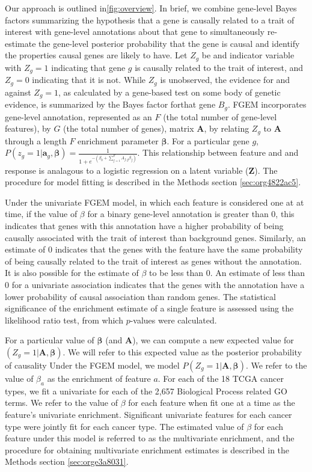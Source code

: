 Our approach is outlined in\ref{fig:overview}. In brief, we combine gene-level Bayes factors summarizing the hypothesis that a gene is causally related to a trait of interest with gene-level annotations about that gene to simultaneously re-estimate the gene-level posterior probability that the gene is causal and identify the properties causal genes are likely to have.  Let $Z_g$ be and indicator variable with $Z_g = 1$ indicating that gene $g$ is causally related to the trait of interest, and $Z_g = 0$ indicating that it is not.  While $Z_g$ is unobserved, the evidence for and against $Z_g=1$, as calculated by a gene-based test on some body of genetic evidence, is summarized by the Bayes factor forthat gene $B_g$.  FGEM incorporates gene-level annotation, represented as an $F$ (the total number of gene-level features), by $G$ (the total number of genes), matrix $\textbf{A}$, by relating $Z_g$ to $\textbf{A}$ through a length $F$  enrichment parameter $\boldsymbol{\beta}$.  For a particular gene $g$, $P(z_g=1|\textbf{a}_g,\boldsymbol{\beta}) =  \frac{1}{1+e^{-(\beta_{0}+\sum_{f=1}^F{A_{f,g}\beta_f})}} $.  This relationship between feature and and response is
analagous to a logistic regression on a latent variable ($\textbf{Z}$).  The procedure for model fitting is described in the Methods section \ref{sec:org4822ac5}.

Under the univariate FGEM model, in which each feature is considered one at at time, if the value of $\beta$ for a binary gene-level annotation is greater than $0$, this indicates that genes with this annotation have a higher probability of being causally associated with the trait of interest than background genes.  Similarly, an estimate of $0$ indicates that the genes with the feature have the same probability of being causally related to the trait of interest as genes without the annotation.  It is also possible for the estimate of $\beta$ to be less than $0$.  An estimate of less than 0 for a univariate association indicates that the genes with the annotation have a lower probability of causal association than random genes.  The statistical significance of the enrichment estimate of a single feature is assessed using the likelihood ratio test, from which $p$-values were calculated.

For a particular value of $\boldsymbol{\beta}$ (and $\textbf{A}$), we can compute a new expected value for $(Z_g = 1 | \textbf{A},\boldsymbol{\beta})$.  We will refer to this expected value as the posterior probability of causality      Under the FGEM model, we model $P(Z_g = 1 | \textbf{A},\boldsymbol{\beta})$.  We refer to the value of $\beta_a$ as the enrichment of feature $a$.  For each of the 18 TCGA cancer types, we fit a univariate for each of the 2,657 Biological Process related GO terms.  We refer to the value of $\beta$ for each feature when fit one at a time as the feature's univariate enrichment.  Significant univariate features for each cancer type were jointly fit for each cancer type.  The estimated value of $\beta$ for each feature under this model is referred to as the multivariate enrichment, and the procedure for obtaining multivariate enrichment estimates is described in the Methods section \ref{sec:orge3a8031}.

